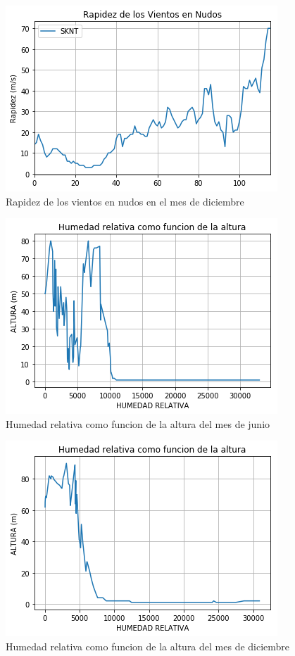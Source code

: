 \documentclass{article}
\begin{document}
\begin{figure}
  \centering
  \includegraphics[scale=0.5]{nudosd.png}
  \caption{Rapidez de los vientos en nudos en el mes de diciembre}
\end{figure}

\begin{figure}[h]
  \centering
  \includegraphics[scale=0.5]{humedadj.png}
  \caption{Humedad relativa como funcion de la altura del mes de junio}
\end{figure}

\begin{figure}[h!]
  \centering
  \includegraphics[scale=0.5]{humedadd.png}
  \caption{Humedad relativa como funcion de la altura del mes de diciembre}
\end{figure}
\end{document}
